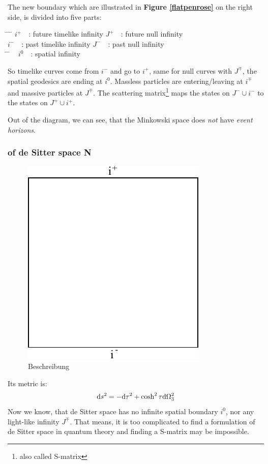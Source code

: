 	The new boundary which are illustrated in \textbf{Figure \ref{flatpenrose}} on the right side, is divided into five parts:	
		\begin{tabbing}
			\hspace{0.1\linewidth} \= \hspace{0.4\linewidth} \= \hspace{0.1\linewidth} \= \hfill \kill
			$i^+$~~: \> future timelike infinity \> $J^+$~~: \> future null infinity \\
			$i^-$~~: \> past timelike infinity \> $J^-$~~: \> past null infinity\\
			\hspace{0.35\linewidth} \= \hspace{0.1\linewidth} \= \hfill \kill	
			~ \> $i^0$~~: \> spatial infinity 
		\end{tabbing}
	So timelike curves come from $i^-$ and go to $i^+$, same for null curves with $J^\mp$, the spatial geodesics are ending at $i^0$. Massless particles are entering/leaving at $i^\mp$ and massive particles at $J^\mp$. The scattering matrix\footnote{also called S-matrix} maps the states on $J^- \cup i^-$ to the states on $J^+ \cup i^+$.	
	
	Out of the diagram, we can see, that the Minkowski space does \textit{not} have \textit{event horizons}.
	
	\subsubsection{of de Sitter space \textbf{N}}
	\begin{figure}[tbp]
	 	\begin{center}
			\includegraphics[scale=0.8]{dspenrose}
		\end{center}
	  		\caption{Beschreibung}\label{dspenrose}
	\end{figure}
	Its metric is:
		\begin{equation}
			\mathrm{d} s^2=- \mathrm{d} \tau^2+\cosh^2\tau \mathrm{d} \Omega^2_3
		\end{equation}
		Now we know, that de Sitter space has no infinite spatial boundary $i^0$, nor any light-like infinity $J^\mp$. That means, it is too complicated to find a formulation of de Sitter space in quantum theory and finding a S-matrix may be impossible. 
		
